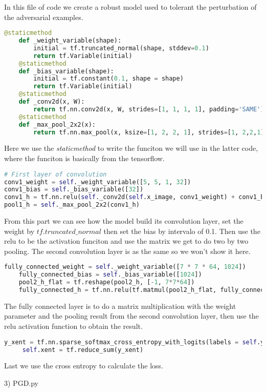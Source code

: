\documentclass[
	letterpaper, %
	10pt, %
]{CSUniSchoolLabReport}
\begin{document}
In this file of code we create a robust model used to tolerant the perturbation of the adversarial examples. 
\begin{lstlisting}[language=Python]
	@staticmethod
	def _weight_variable(shape):
		initial = tf.truncated_normal(shape, stddev=0.1)
		return tf.Variable(initial)
	@staticmethod
	def _bias_variable(shape):
		initial = tf.constant(0.1, shape = shape)
		return tf.Variable(initial)
	@staticmethod
	def _conv2d(x, W):
		return tf.nn.conv2d(x, W, strides=[1, 1, 1, 1], padding='SAME')
	@staticmethod
	def _max_pool_2x2(x):
		return tf.nn.max_pool(x, ksize=[1, 2, 2, 1], strides=[1, 2,2,1], padding='SAME')	
\end{lstlisting}
Here we use the \emph{staticmethod} to write the funciton we will use in the latter code, where the funciton is basically from the tensorflow.
\begin{lstlisting}[language=Python]
# First layer of convolution
conv1_weight = self._weight_variable([5, 5, 1, 32])
conv1_bias = self._bias_variable([32])
conv1_h = tf.nn.relu(self._conv2d(self.x_image, conv1_weight) + conv1_bias)
pool1_h = self._max_pool_2x2(conv1_h)
\end{lstlisting}
From this part we can see how the model build its convolution layer, set the weight by $tf.truncated\_normal$ then set the bias by intervalo of 0.1. Then use the relu to be the activation funciton and use the matrix we get to do two by two pooling. The second convolution layer is as the same so we won't show it here.
\begin{lstlisting}[language=Python]
	fully_connected_weight = self._weight_variable([7 * 7 * 64, 1024])
	fully_connected_bias = self._bias_variable([1024])
	pool2_h_flat = tf.reshape(pool2_h, [-1, 7*7*64])
	fully_connected_h = tf.nn.relu(tf.matmul(pool2_h_flat, fully_connected_weight) + fully_connected_bias)
\end{lstlisting}
The fully connected layer is to do a matrix multiplication with the weight parameter and the pooling result from the second convolution layer, then use the relu activation function to obtain the result.
\begin{lstlisting}[language=Python]
	 y_xent = tf.nn.sparse_softmax_cross_entropy_with_logits(labels = self.y_input, logits=self.pre_softmax)
	 self.xent = tf.reduce_sum(y_xent)
\end{lstlisting}
Last we use the cross entropy to calculate the loss.

3) PGD.py
\end{document}
